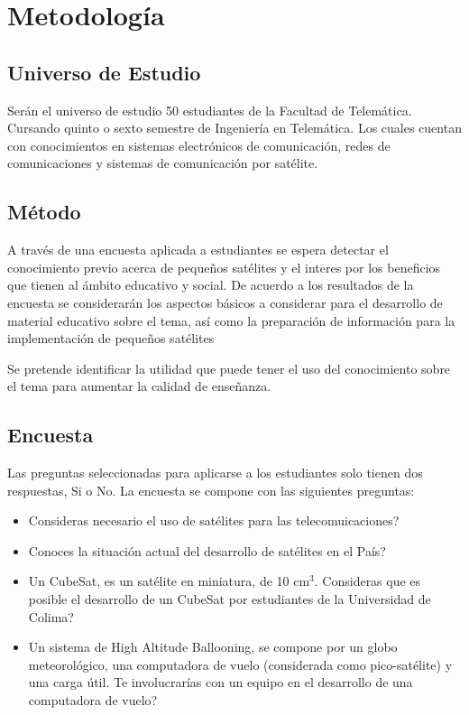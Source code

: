 
\chapter{Metodolog\'{i}a} %



\section{Universo de Estudio}
Ser\'{a}n el universo de estudio 50 estudiantes de la Facultad de Telem\'{a}tica.
Cursando quinto o sexto semestre de Ingenier\'{i}a en Telem\'{a}tica. Los cuales cuentan con conocimientos en sistemas electr\'{o}nicos de comunicaci\'{o}n, redes de comunicaciones y sistemas de comunicaci\'{o}n por sat\'{e}lite.


\section{M\'{e}todo}

A  trav\'{e}s de una encuesta aplicada a estudiantes se espera detectar el conocimiento previo acerca de pequeños sat\'{e}lites y el interes por los beneficios que tienen al \'{a}mbito educativo y social. De acuerdo a los resultados de la encuesta se considerar\'{a}n los aspectos b\'{a}sicos a considerar para el desarrollo de material educativo sobre el tema, as\'{i} como la preparaci\'{o}n de informaci\'{o}n para la implementaci\'{o}n de pequeños sat\'{e}lites

Se pretende identificar la utilidad que puede tener el uso del conocimiento sobre el tema para aumentar la calidad de enseñanza.
\section{Encuesta}

Las preguntas seleccionadas para aplicarse a los estudiantes solo tienen dos respuestas, Si o No. La encuesta se compone con las siguientes preguntas:


\begin{itemize}
	\item Consideras necesario el uso de sat\'{e}lites para las telecomuicaciones?
	\item Conoces la situaci\'{o}n actual del desarrollo de sat\'{e}lites en el Pa\'{i}s?
	\item Un CubeSat, es un sat\'{e}lite en miniatura, de 10 cm$^3$. Consideras que es posible el desarrollo de un CubeSat por estudiantes de la Universidad de Colima?
	\item Un sistema de High Altitude Ballooning, se compone por un globo meteorol\'{o}gico, una computadora de vuelo (considerada como pico-sat\'{e}lite) y una carga \'{u}til. Te involucrar\'{i}as con un equipo en el desarrollo de una computadora de vuelo?
\end{itemize}




